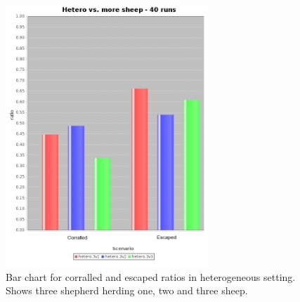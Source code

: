 \documentclass[conference]{IEEEtran}
\begin{document}
\begin{figure}[ht]
	\centering
	\includegraphics[width=3in]{imgs/hetero_3v1-hetero_3v2-hetero_3v3-ratio-bar.jpg}
	\caption{Bar chart for corralled and escaped ratios in heterogeneous setting. Shows three shepherd herding one, two and three sheep.}
	\label{fig:ratios_threeShepherd}
\end{figure}


\vspace{0.5em}
\end{document}
